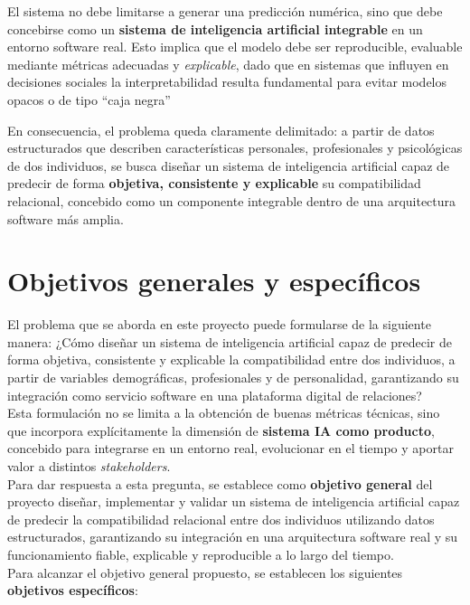 El sistema no debe limitarse a generar una predicción numérica, sino que debe concebirse como un \textbf{sistema de inteligencia artificial integrable} en un entorno software real. Esto implica que el modelo debe ser reproducible, evaluable mediante métricas adecuadas y \textit{explicable}, dado que en sistemas que influyen en decisiones sociales la interpretabilidad resulta fundamental para evitar modelos opacos o de tipo ``caja negra''

En consecuencia, el problema queda claramente delimitado: a partir de datos estructurados que describen características personales, profesionales y psicológicas de dos individuos, se busca diseñar un sistema de inteligencia artificial capaz de predecir de forma \textbf{objetiva, consistente y explicable} su compatibilidad relacional, concebido como un componente integrable dentro de una arquitectura software más amplia.

\section{Objetivos generales y específicos}

El problema que se aborda en este proyecto puede formularse de la siguiente manera: ¿Cómo diseñar un sistema de inteligencia artificial capaz de predecir de forma objetiva, consistente y explicable la compatibilidad entre dos individuos, a partir de variables demográficas, profesionales y de personalidad, garantizando su integración como servicio software en una plataforma digital de relaciones?\\

Esta formulación no se limita a la obtención de buenas métricas técnicas, sino que incorpora explícitamente la dimensión de \textbf{sistema IA como producto}, concebido para integrarse en un entorno real, evolucionar en el tiempo y aportar valor a distintos \textit{stakeholders}.\\

Para dar respuesta a esta pregunta, se establece como \textbf{objetivo general} del proyecto diseñar, implementar y validar un sistema de inteligencia artificial capaz de predecir la compatibilidad relacional entre dos individuos utilizando datos estructurados, garantizando su integración en una arquitectura software real y su funcionamiento fiable, explicable y reproducible a lo largo del tiempo.\\

Para alcanzar el objetivo general propuesto, se establecen los siguientes \textbf{objetivos específicos}:

